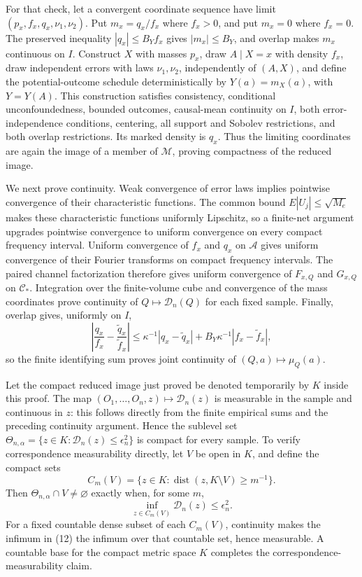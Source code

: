 For that check, let a convergent coordinate sequence have limit \((p_x,f_x,q_x,\nu_1,\nu_2)\).  Put \(m_x=q_x/f_x\) where \(f_x>0\), and put \(m_x=0\) where \(f_x=0\).  The preserved inequality \(|q_x|\le B_Yf_x\) gives \(|m_x|\le B_Y\), and overlap makes \(m_x\) continuous on \(I\).  Construct \(X\) with masses \(p_x\), draw \(A\mid X=x\) with density \(f_x\), draw independent errors with laws \(\nu_1,\nu_2\), independently of \((A,X)\), and define the potential-outcome schedule deterministically by \(Y(a)=m_X(a)\), with \(Y=Y(A)\).  This construction satisfies consistency, conditional unconfoundedness, bounded outcomes, causal-mean continuity on \(I\), both error-independence conditions, centering, all support and Sobolev restrictions, and both overlap restrictions.  Its marked density is \(q_x\).  Thus the limiting coordinates are again the image of a member of \(\mathcal M\), proving compactness of the reduced image.

We next prove continuity.  Weak convergence of error laws implies pointwise convergence of their characteristic functions.  The common bound \(E|U_j|\le\sqrt{M_e}\) makes these characteristic functions uniformly Lipschitz, so a finite-net argument upgrades pointwise convergence to uniform convergence on every compact frequency interval.  Uniform convergence of \(f_x\) and \(q_x\) on \(\mathcal A\) gives uniform convergence of their Fourier transforms on compact frequency intervals.  The paired channel factorization therefore gives uniform convergence of \(F_{x,Q}\) and \(G_{x,Q}\) on \(\mathcal C_*\).  Integration over the finite-volume cube and convergence of the mass coordinates prove continuity of \(Q\mapsto\mathscr D_n(Q)\) for each fixed sample.  Finally, overlap gives, uniformly on \(I\),
\[
\left|\frac{q_x}{f_x}-\frac{\widetilde q_x}{\widetilde f_x}\right|
\le \kappa^{-1}|q_x-\widetilde q_x|
+B_Y\kappa^{-1}|f_x-\widetilde f_x|, \tag{11}
\]
so the finite identifying sum proves joint continuity of \((Q,a)\mapsto\mu_Q(a)\).

Let the compact reduced image just proved be denoted temporarily by \(K\) inside this proof.  The map \((O_1,\ldots,O_n,z)\mapsto\mathscr D_n(z)\) is measurable in the sample and continuous in \(z\): this follows directly from the finite empirical sums and the preceding continuity argument.  Hence the sublevel set \(\Theta_{n,\alpha}=\{z\in K:\mathscr D_n(z)\le\epsilon_n^2\}\) is compact for every sample.  To verify correspondence measurability directly, let \(V\) be open in \(K\), and define the compact sets
\[
C_m(V)=\{z\in K:\operatorname{dist}(z,K\setminus V)\ge m^{-1}\}.
\]
Then \(\Theta_{n,\alpha}\cap V\ne\varnothing\) exactly when, for some \(m\),
\[
\inf_{z\in C_m(V)}\mathscr D_n(z)\le\epsilon_n^2. \tag{12}
\]
For a fixed countable dense subset of each \(C_m(V)\), continuity makes the infimum in (12) the infimum over that countable set, hence measurable.  A countable base for the compact metric space \(K\) completes the correspondence-measurability claim.

